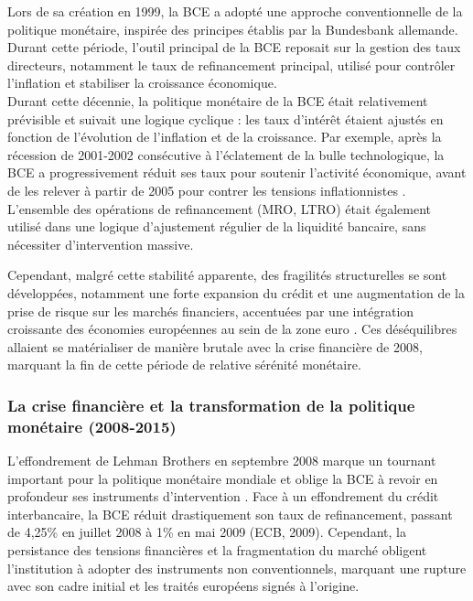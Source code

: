 Lors de sa création en 1999, la BCE a adopté une approche conventionnelle de la politique monétaire, inspirée des principes établis par la Bundesbank allemande. Durant cette période, l’outil principal de la BCE reposait sur la gestion des taux directeurs, notamment le taux de refinancement principal, utilisé pour contrôler l’inflation et stabiliser la croissance économique.\\

Durant cette décennie, la politique monétaire de la BCE était relativement prévisible et suivait une logique cyclique : les taux d’intérêt étaient ajustés en fonction de l’évolution de l’inflation et de la croissance. Par exemple, après la récession de 2001-2002 consécutive à l’éclatement de la bulle technologique, la BCE a progressivement réduit ses taux pour soutenir l’activité économique, avant de les relever à partir de 2005 pour contrer les tensions inflationnistes \citep{angeloni2003}. L’ensemble des opérations de refinancement (MRO, LTRO) était également utilisé dans une logique d’ajustement régulier de la liquidité bancaire, sans nécessiter d’intervention massive.

\newpage

Cependant, malgré cette stabilité apparente, des fragilités structurelles se sont développées, notamment une forte expansion du crédit et une augmentation de la prise de risque sur les marchés financiers, accentuées par une intégration croissante des économies européennes au sein de la zone euro \citep{bernanke2001}. Ces déséquilibres allaient se matérialiser de manière brutale avec la crise financière de 2008, marquant la fin de cette période de relative sérénité monétaire.

\subsubsection{La crise financière et la transformation de la politique monétaire (2008-2015)}

L’effondrement de Lehman Brothers en septembre 2008 marque un tournant important pour la politique monétaire mondiale et oblige la BCE à revoir en profondeur ses instruments d’intervention \citep{reinhart2009}. Face à un effondrement du crédit interbancaire, la BCE réduit drastiquement son taux de refinancement, passant de 4,25\% en juillet 2008 à 1\% en mai 2009 (ECB, 2009). Cependant, la persistance des tensions financières et la fragmentation du marché obligent l’institution à adopter des instruments non conventionnels, marquant une rupture avec son cadre initial et les traités européens signés à l'origine.\\

